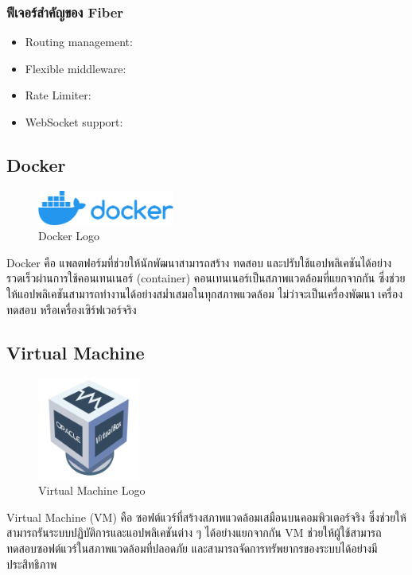     \subsubsection{ฟีเจอร์สำคัญของ Fiber}
    \begin{itemize}
        \item Routing management:
        \item Flexible middleware: 
        \item Rate Limiter:
        \item WebSocket support:
    \end{itemize}
\subsection{Docker}
    \begin{figure}[ht]
        \centering
        \includegraphics[width=0.4\textwidth, keepaspectratio]{image/Tools/docker-logo.png}
        \caption[Docker Logo]{Docker Logo\footnotemark}
        \label{fig:docker_logo}
    \end{figure}
    \FloatBarrier
    \qquad Docker คือ แพลตฟอร์มที่ช่วยให้นักพัฒนาสามารถสร้าง ทดสอบ และปรับใช้แอปพลิเคชันได้อย่างรวดเร็วผ่านการใช้คอนเทนเนอร์ (container) คอนเทนเนอร์เป็นสภาพแวดล้อมที่แยกจากกัน ซึ่งช่วยให้แอปพลิเคชันสามารถทำงานได้อย่างสม่ำเสมอในทุกสภาพแวดล้อม ไม่ว่าจะเป็นเครื่องพัฒนา เครื่องทดสอบ หรือเครื่องเซิร์ฟเวอร์จริง

\subsection{Virtual Machine}
    \begin{figure}[ht]
        \centering
        \includegraphics[width=0.3\textwidth, keepaspectratio]{image/Tools/virtualbox-logo.png}
        \caption[Virtual Machine Logo]{Virtual Machine Logo\footnotemark}
        \label{fig:Virtual Machine_logo}
    \end{figure}
    \FloatBarrier
    \qquad Virtual Machine (VM) คือ ซอฟต์แวร์ที่สร้างสภาพแวดล้อมเสมือนบนคอมพิวเตอร์จริง ซึ่งช่วยให้สามารถรันระบบปฏิบัติการและแอปพลิเคชันต่าง ๆ ได้อย่างแยกจากกัน VM ช่วยให้ผู้ใช้สามารถทดสอบซอฟต์แวร์ในสภาพแวดล้อมที่ปลอดภัย และสามารถจัดการทรัพยากรของระบบได้อย่างมีประสิทธิภาพ
